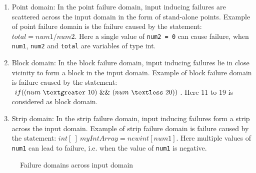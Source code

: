 \begin{enumerate}
\item Point domain: In the point failure domain, input inducing failures are scattered across the input domain in the form of stand-alone points. Example of point failure domain is the failure caused by the statement: $total = num1/num2$. Here a single value of \verb+num2 = 0+ can cause failure, when \verb+num1+, \verb+num2+ and \verb+total+ are variables of type int.
\item Block domain: In the block failure domain, input inducing failures lie in close vicinity to form a block in the input domain. Example of block failure domain is failure caused by the statement: $if ( (num~\textgreater~10)~\&\&~(num~\textless~20) )$. Here 11 to 19 is considered as block domain.
\item Strip domain: In the strip failure domain, input inducing failures form a strip across the input domain. Example of strip failure domain is failure caused by the statement: $int[~]~myIntArray = new int[num1]$. Here multiple values of \verb+num1+ can lead to failure, i.e. when the value of \verb+num1+ is negative.
\end{enumerate}
\smallskip
\begin{figure} [H]
\centering
{}

\caption{Failure domains across input domain~\cite{chan1996proportional}}
\label{fig:patterns2}
\end{figure}

